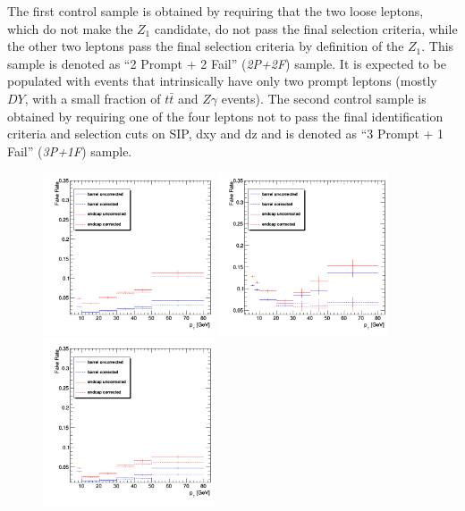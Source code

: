 The first control sample is obtained by
requiring that the two loose leptons, which do not make the $Z_1$ candidate, 
do not pass the final selection criteria, while the other two leptons pass
the final selection criteria by definition of the $Z_1$. 
This sample is denoted as ``2 Prompt + 2 Fail'' ({\it 2P+2F}) sample. 
It is expected to be populated with events that intrinsically have only two prompt leptons 
(mostly $DY$, with a small fraction of $t \bar{t}$ and $Z \gamma$ events).
The second control sample is obtained by requiring one of
the four leptons not to pass the final identification criteria 
and selection cuts on SIP, dxy and dz and is denoted as ``3 Prompt + 1 Fail'' ({\it 3P+1F}) sample. 
\begin{figure}[!]
\begin{center}
    {\includegraphics [width=0.45\textwidth] {Figures/RedBkg/FR/FR_OS_electrons_2016.png}}
    {\includegraphics [width=0.45\textwidth] {Figures/RedBkg/FR/FR_OS_muons_2016.png}} \\
    {\includegraphics [width=0.45\textwidth] {Figures/RedBkg/FR/FR_OS_electrons_2017.png}}

\end{center}
\end{figure}
